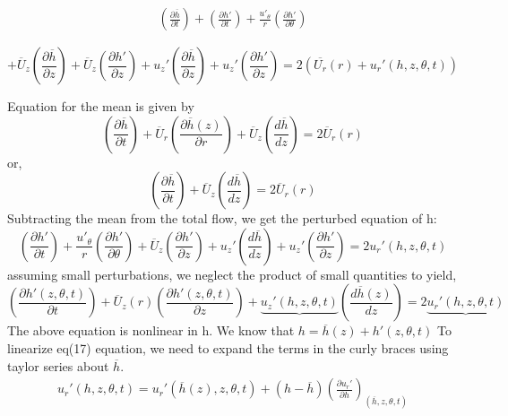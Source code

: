 \documentclass{article}
\begin{document}
\begin{eqnarray*}
\left(\frac{\partial\overline{h}}{\partial t}\right)+\left(\frac{\partial h'}{\partial t}\right)+\frac{u'_{\theta}}{r}\left(\frac{\partial h'}{\partial\theta}\right)
\end{eqnarray*}

\begin{equation}
+\overline{U}_{z}\left(\frac{\partial\overline{h}}{\partial z}\right)+\overline{U}_{z}\left(\frac{\partial h'}{\partial z}\right)+u_{z}'\left(\frac{\partial\overline{h}}{\partial z}\right)+u_{z}'\left(\frac{\partial h'}{\partial z}\right)=2(\overline{U_{r}}(r)+u_{r}'(h,z,\theta,t))
\end{equation}

Equation for the mean is given by
\begin{equation}
\left(\frac{\partial\overline{h}}{\partial t}\right)+\overline{U}_{r}\left(\frac{\partial\overline{h}(z)}{\partial r}\right)+\overline{U}_{z}\left(\frac{d\overline{h}}{dz}\right)=2\overline{U}_{r}(r)
\end{equation}
or,
\begin{equation}
\left(\frac{\partial\overline{h}}{\partial t}\right)+\overline{U}_{z}\left(\frac{d\overline{h}}{dz}\right)=2\overline{U}_{r}(r)
\end{equation}
Subtracting the mean from the total flow, we get the perturbed equation
of h:
\begin{equation}
\left(\frac{\partial h'}{\partial t}\right)+\frac{u'_{\theta}}{r}\left(\frac{\partial h'}{\partial\theta}\right)+\overline{U}_{z}\left(\frac{\partial h'}{\partial z}\right)+u_{z}'\left(\frac{d\overline{h}}{dz}\right)+u_{z}'\left(\frac{\partial h'}{\partial z}\right)=2u_{r}'(h,z,\theta,t)
\end{equation}
assuming small perturbations, we neglect the product of small quantities
to yield,
\begin{equation}
\left(\frac{\partial h'(z,\theta,t)}{\partial t}\right)+\overline{U}_{z}(r)\left(\frac{\partial h'(z,\theta,t)}{\partial z}\right)+\underbrace{u_{z}'(h,z,\theta,t)}\left(\frac{d\overline{h}(z)}{dz}\right)=2\underbrace{u_{r}'(h,z,\theta,t)}
\end{equation}
The above equation is nonlinear in h. We know that $h=\overline{h}(z)+h'(z,\theta,t)$
To linearize eq(17) equation, we need to expand the terms in the curly
braces using taylor series about $\overline{h}$.
\begin{eqnarray*}
u_{r}'(h,z,\theta,t)=u_{r}'(\overline{h}(z),z,\theta,t)+(h-\overline{h})\left(\frac{\partial u_{r}'}{\partial h}\right)_{(\overline{h},z,\theta,t)}
\end{eqnarray*}
\end{document}
